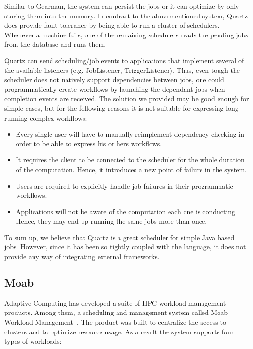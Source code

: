 \documentclass[11pt,a4paper,twoside]{report}
\begin{document}
Similar to Gearman, the system can persist the jobs or it can optimize by only storing them into the memory. In contrast to the abovementioned system, Quartz does provide fault tolerance by being able to run a cluster of schedulers. Whenever a machine fails, one of the remaining schedulers reads the pending jobs from the database and runs them.


Quartz can send scheduling/job events to applications that implement several of the available listeners (e.g. JobListener, TriggerListener). Thus, even tough the scheduler does not natively support dependencies between jobs, one could programmatically create workflows by launching the dependant jobs when completion events are received. The solution we provided may be good enough for simple cases, but for the following reasons it is not suitable for expressing long running complex workflows:

\begin{itemize}
\item{}
Every single user will have to manually reimplement dependency checking in order to be able to express his or hers workflows.
\item{}
It requires the client to be connected to the scheduler for the whole duration of the computation. Hence, it introduces a new point of failure in the system.
\item{}
Users are required to explicitly handle job failures in their programmatic workflows.
\item{}
Applications will not be aware of the computation each one is conducting. Hence, they may end up running the same jobs more than once.
\end{itemize}


To sum up, we believe that Quartz is a great scheduler for simple Java based jobs. However, since it has been so tightly coupled with the language, it does not provide any way of integrating external frameworks.

\subsection{Moab}
Adaptive Computing has developed a suite of HPC workload management products. Among them, a scheduling and management system called Moab Workload Management~\cite{Moab}. The product was built to centralize the access to clusters and to optimize resource usage. As a result the system supports four types of workloads:
\end{document}
